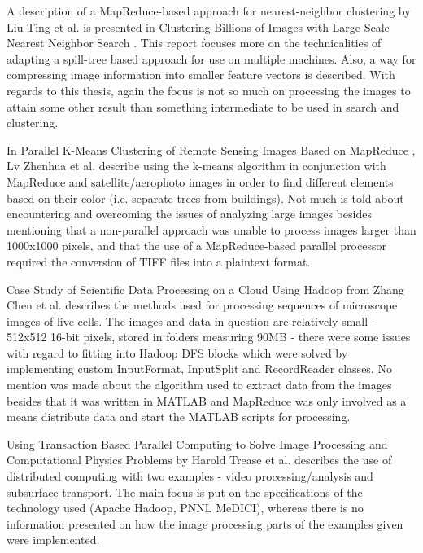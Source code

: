 \documentclass [12pt,a4paper]{report}
\begin{document}
A description of a MapReduce-based approach for nearest-neighbor clustering by Liu Ting et al. is presented in Clustering Billions of Images with Large Scale Nearest Neighbor Search \cite{citeulike:2631015}. This report focuses more on the technicalities of adapting a spill-tree based approach for use on multiple machines. Also, a way for compressing image information into smaller feature vectors is described. With regards to this thesis, again the focus is not so much on processing the images to attain some other result than something intermediate to be used in search and clustering.

In Parallel K-Means Clustering of Remote Sensing Images Based on MapReduce \cite{Lv:2010:PKC:1927661.1927687}, Lv Zhenhua et al. describe using the k-means algorithm in conjunction with MapReduce and satellite/aerophoto images in order to find different elements based on their color (i.e. separate trees from buildings). Not much is told about encountering and overcoming the issues of analyzing large images besides mentioning that a non-parallel approach was unable to process images larger than 1000x1000 pixels, and that the use of a MapReduce-based parallel processor required the conversion of TIFF files into a plaintext format.

Case Study of Scientific Data Processing on a Cloud Using Hadoop \cite{Zhang:2009:CSS:2127968.2128002} from Zhang Chen et al. describes the methods used for processing sequences of microscope images of live cells. The images and data in question are relatively small - 512x512 16-bit pixels, stored in folders measuring 90MB - there were some issues with regard to fitting into Hadoop DFS blocks which were solved by implementing custom InputFormat, InputSplit and RecordReader classes. No mention was made about the algorithm used to extract data from the images besides that it was written in MATLAB and MapReduce was only involved as a means distribute data and start the MATLAB scripts for processing.

Using Transaction Based Parallel Computing to Solve Image Processing and Computational Physics Problems \cite{trease08} by Harold Trease et al. describes the use of distributed computing with two examples - video processing/analysis and subsurface transport. The main focus is put on the specifications of the technology used (Apache Hadoop, PNNL MeDICI), whereas there is no information presented on how the image processing parts of the examples given were implemented.
\end{document}
